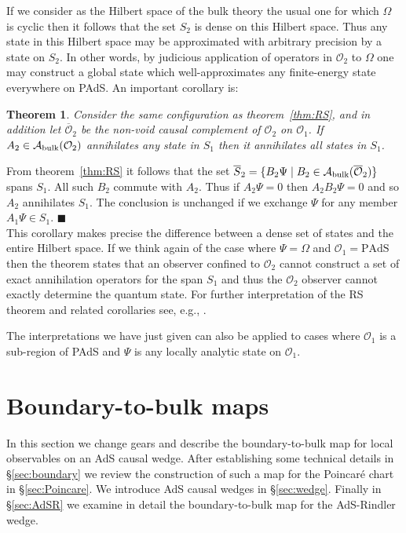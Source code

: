 \documentclass[12pt,a4paper]{article}
\numberwithin{equation}{section}
\newtheorem{theorem}{Theorem}[section]
\def\proof{\noindent{\em Proof.~}}
\def\cO{{\mathcal{O}}}
\def\cAbulk{{\mathcal{A}_{\rm bulk}}}
\begin{document}
If we consider as the Hilbert space of the bulk theory the usual
one for which $\Omega$ is cyclic then it follows that the set
$S_2$ is dense on this Hilbert space. Thus any state in this
Hilbert space may be approximated
with arbitrary precision by a state on $S_2$.
In other words, by judicious application of operators in $\cO_2$
to $\Omega$ one may construct a global state which well-approximates 
any finite-energy state everywhere on PAdS. 
An important corollary is:
\begin{theorem} \label{thm:RSc}
  Consider the same configuration as theorem~\ref{thm:RS}, and
  in addition let $\overline{\cO}_2$ be the non-void causal complement
  of $\cO_2$ on $\cO_1$.
  If $A_2 \in \cAbulk(\cO_2)$ annihilates any state in $S_1$ then
  it annihilates all states in $S_1$. 
\end{theorem}
\proof From theorem~\ref{thm:RS} it follows that the set
$\overline{S}_2 = \{ B_2 \Psi \; | \; 
B_2 \in \cAbulk(\overline{\cO}_2) \}$
spans $S_1$. All such $B_2$ commute with $A_2$. Thus if $A_2\Psi = 0$ 
then $A_2 B_2 \Psi = 0$ and so $A_2$ annihilates $S_1$. 
The conclusion is unchanged if we exchange $\Psi$ for any member $A_1 \Psi
 \in S_1$. $\blacksquare$
\vspace{8pt}\\
This corollary makes precise the difference between 
a dense set of states and the entire Hilbert space.
If we think again of the case where $\Psi = \Omega$ and $\cO_1 = \text{PAdS}$
then the theorem states that an observer confined
to $\cO_2$ cannot construct a set of exact annihilation operators
for the span $S_1$ and thus the $\cO_2$ observer cannot exactly
determine the quantum state. For further interpretation of the
RS theorem and related corollaries see, e.g., 
\cite{Haag:1992aa,Streater:1989vi}.


The interpretations we have just given can also be applied to 
cases where $\cO_1$ is a sub-region of PAdS and $\Psi$ is any
locally analytic state on $\cO_1$. 


\section{Boundary-to-bulk maps}
\label{sec:b2b}


In this section we change gears and describe the boundary-to-bulk
map for local observables on an AdS causal wedge. After establishing
some technical details in \S\ref{sec:boundary} we review the construction
of such a map for the Poincar\'e chart in \S\ref{sec:Poincare}. We introduce
AdS causal wedges in \S\ref{sec:wedge}. Finally in \S\ref{sec:AdSR} we
examine in detail the boundary-to-bulk map for the AdS-Rindler wedge.
\end{document}
